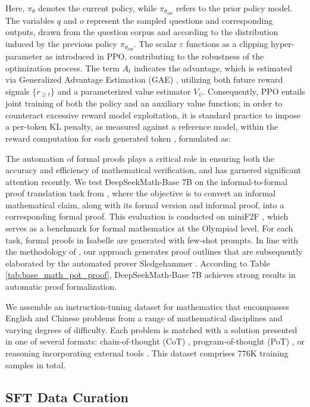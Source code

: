 Here, $\pi_{\theta}$ denotes the current policy, while $\pi_{\theta_{old}}$ refers to the prior policy model. The variables $q$ and $o$ represent the sampled questions and corresponding outputs, drawn from the question corpus and according to the distribution induced by the previous policy $\pi_{\theta_{old}}$. The scalar $\varepsilon$ functions as a clipping hyper-parameter as introduced in PPO, contributing to the robustness of the optimization process. The term $A_t$ indicates the advantage, which is estimated via Generalized Advantage Estimation (GAE) \citep{gae}, utilizing both future reward signals $\{r_{\ge t}\}$ and a parameterized value estimator $V_{\psi}$. Consequently, PPO entails joint training of both the policy and an auxiliary value function; in order to counteract excessive reward model exploitation, it is standard practice to impose a per-token KL penalty, as measured against a reference model, within the reward computation for each generated token \citep{ouyang2022training}, formulated as:

The automation of formal proofs plays a critical role in ensuring both the accuracy and efficiency of mathematical verification, and has garnered significant attention recently. We test DeepSeekMath-Base 7B on the informal-to-formal proof translation task from \citep{dsp_proof}, where the objective is to convert an informal mathematical claim, along with its formal version and informal proof, into a corresponding formal proof. This evaluation is conducted on miniF2F \citep{minif2f}, which serves as a benchmark for formal mathematics at the Olympiad level. For each task, formal proofs in Isabelle are generated with few-shot prompts. In line with the methodology of \cite{dsp_proof}, our approach generates proof outlines that are subsequently elaborated by the automated prover Sledgehammer \citep{sledgehammer}. According to Table \ref{tab:base_math_pot_proof}, DeepSeekMath-Base 7B achieves strong results in automatic proof formalization.

We assemble an instruction-tuning dataset for mathematics that encompasses English and Chinese problems from a range of mathematical disciplines and varying degrees of difficulty. Each problem is matched with a solution presented in one of several formats: chain-of-thought (CoT) \citep{cot}, program-of-thought (PoT) \citep{pot,pal}, or reasoning incorporating external tools \citep{tora}. This dataset comprises 776K training samples in total.

\subsection{SFT Data Curation}

